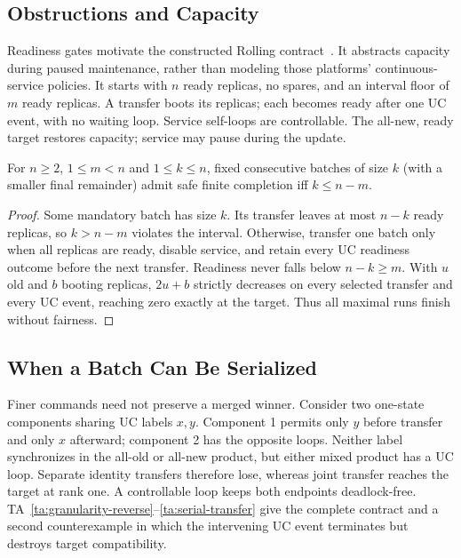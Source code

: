 \documentclass[acmsmall,screen,review,anonymous]{acmart}
\begin{document}
\subsection{Obstructions and Capacity}

Readiness gates motivate the constructed Rolling contract~\cite{e6_kubernetes_deployments,e6_mongodb_enterprise_replica_set}. It abstracts capacity during paused maintenance, rather than modeling those platforms' continuous-service policies. It starts with $n$ ready replicas, no spares, and an interval floor of $m$ ready replicas. A transfer boots its replicas; each becomes ready after one UC event, with no waiting loop. Service self-loops are controllable. The all-new, ready target restores capacity; service may pause during the update.

\begin{proposition}\label{prop:rolling-threshold}
For $n\ge2$, $1\le m<n$ and $1\le k\le n$, fixed consecutive batches of size $k$ (with a smaller final remainder) admit safe finite completion iff $k\le n-m$.
\end{proposition}
\begin{proof}
Some mandatory batch has size $k$. Its transfer leaves at most $n-k$ ready replicas, so $k>n-m$ violates the interval. Otherwise, transfer one batch only when all replicas are ready, disable service, and retain every UC readiness outcome before the next transfer. Readiness never falls below $n-k\ge m$. With $u$ old and $b$ booting replicas, $2u+b$ strictly decreases on every selected transfer and every UC event, reaching zero exactly at the target. Thus all maximal runs finish without fairness.
\end{proof}

\subsection{When a Batch Can Be Serialized}\label{sec:serialization}
Finer commands need not preserve a merged winner. Consider two one-state components sharing UC labels $x,y$. Component 1 permits only $y$ before transfer and only $x$ afterward; component 2 has the opposite loops. Neither label synchronizes in the all-old or all-new product, but either mixed product has a UC loop. Separate identity transfers therefore lose, whereas joint transfer reaches the target at rank one. A controllable loop keeps both endpoints deadlock-free. TA~\ref{ta:granularity-reverse}--\ref{ta:serial-transfer} give the complete contract and a second counterexample in which the intervening UC event terminates but destroys target compatibility.
\end{document}
